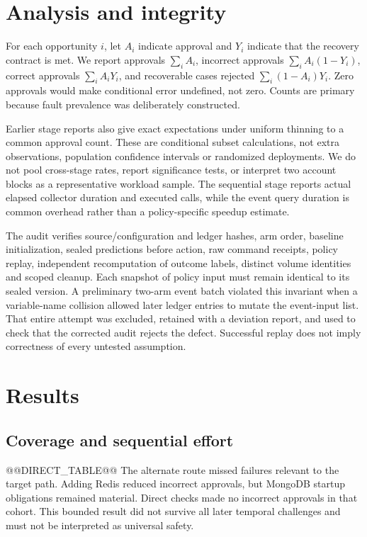 \documentclass[11pt]{article}
\begin{document}
\section{Analysis and integrity}
For each opportunity $i$, let $A_i$ indicate approval and $Y_i$ indicate that the recovery contract is met. We report approvals $\sum_i A_i$, incorrect approvals $\sum_i A_i(1-Y_i)$, correct approvals $\sum_i A_iY_i$, and recoverable cases rejected $\sum_i(1-A_i)Y_i$. Zero approvals would make conditional error undefined, not zero. Counts are primary because fault prevalence was deliberately constructed.

Earlier stage reports also give exact expectations under uniform thinning to a common approval count. These are conditional subset calculations, not extra observations, population confidence intervals or randomized deployments. We do not pool cross-stage rates, report significance tests, or interpret two account blocks as a representative workload sample. The sequential stage reports actual elapsed collector duration and executed calls, while the event query duration is common overhead rather than a policy-specific speedup estimate.

The audit verifies source/configuration and ledger hashes, arm order, baseline initialization, sealed predictions before action, raw command receipts, policy replay, independent recomputation of outcome labels, distinct volume identities and scoped cleanup. Each snapshot of policy input must remain identical to its sealed version. A preliminary two-arm event batch violated this invariant when a variable-name collision allowed later ledger entries to mutate the event-input list. That entire attempt was excluded, retained with a deviation report, and used to check that the corrected audit rejects the defect. Successful replay does not imply correctness of every untested assumption.

\section{Results}
\subsection{Coverage and sequential effort}
@@DIRECT_TABLE@@
The alternate route missed failures relevant to the target path. Adding Redis reduced incorrect approvals, but MongoDB startup obligations remained material. Direct checks made no incorrect approvals in that cohort. This bounded result did not survive all later temporal challenges and must not be interpreted as universal safety.
\end{document}
